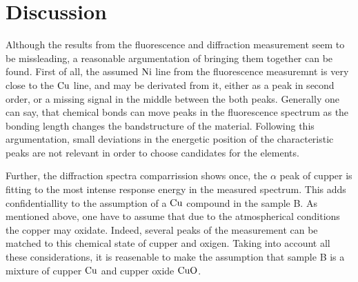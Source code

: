 \section{Discussion}
\label{sec:Discussion}


Although the results from the fluorescence and diffraction measurement seem to be missleading, a reasonable argumentation of bringing them together can be found.
First of all, the assumed $\ce{Ni}$ line from the fluorescence measuremnt is very close to the $\ce{Cu}$ line, and may be derivated from it, either as a peak in second order, or a missing signal in the middle between the both peaks.
Generally one can say, that chemical bonds can move peaks in the fluorescence spectrum as the bonding length changes the bandstructure of the material.
Following this argumentation, small deviations in the energetic position of the characteristic peaks are not relevant in order to choose candidates for the elements.

Further, the diffraction spectra comparrission shows once, the $\alpha$ peak of cupper is fitting to the most intense response energy in the measured spectrum. 
This adds confidentiallity to the assumption of a $\ce{Cu}$ compound in the sample B.
As mentioned above, one have to assume that due to the atmospherical conditions the copper may oxidate. 
Indeed, several peaks of the measurement can be matched to this chemical state of cupper and oxigen. 
Taking into account all these considerations, it is reasenable to make the assumption that sample B is a mixture of cupper $\ce{Cu}$ and cupper oxide $\ce{CuO}$.
